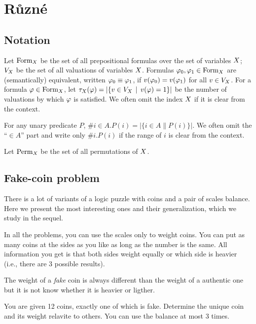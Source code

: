 \chapter{Různé}

\section[0]{Notation}
Let $\textrm{Form}_X$ be the set of all prepositional formulas over
  the set of variables $X$;
  $V_X$ be the set of all valuations of variables $X$.
Formulas $\varphi_0, \varphi_1 \in \textrm{Form}_X$ are (semantically) equivalent,
  written $\varphi_0 \equiv \varphi_1$, if
  $v(\varphi_0) = v(\varphi_1)$ for all $v\in V_X$.
For a formula $\varphi\in\textrm{Form}_X$, let
  $\tau_X(\varphi) = |\{ v\in V_X \:\:|\:\: v(\varphi) = 1 \}|$
  be the number of valuations by which $\varphi$ is satisfied.
We often omit the index $X$ if it is clear from the context.

For any unary predicate $P$, $\#i\in A.P(i) = |\{ i\in A \| P(i)\}|$.
  We often omit the ``$\in A$'' part and write only $\#i.P(i)$
  if the range of $i$ is clear from the context.

Let $\textrm{Perm}_X$ be the set of all permutations of $X$.

\section{Fake-coin problem}

There is a lot of variants of a logic puzzle with coins and a pair of scales balance.
Here we present the most interesting ones and their generalization, which we study in the sequel.

In all the problems, you can use the scales only to weight coins.
You can put as many coins at the sides as you like as long as the number is the same.
All information you get is that both sides weight equally or which side is heavier (i.e., there are 3 possible results).

The weight of a \emph{fake} coin is always different than
the weight of a authentic one
but it is not know whether it is heavier or ligther.

\begin{problem}
You are given 12 coins, exactly one of which is fake.
Determine the unique coin and its weight relavite to others.
You can use the balance at most 3 times.
\end{problem}

